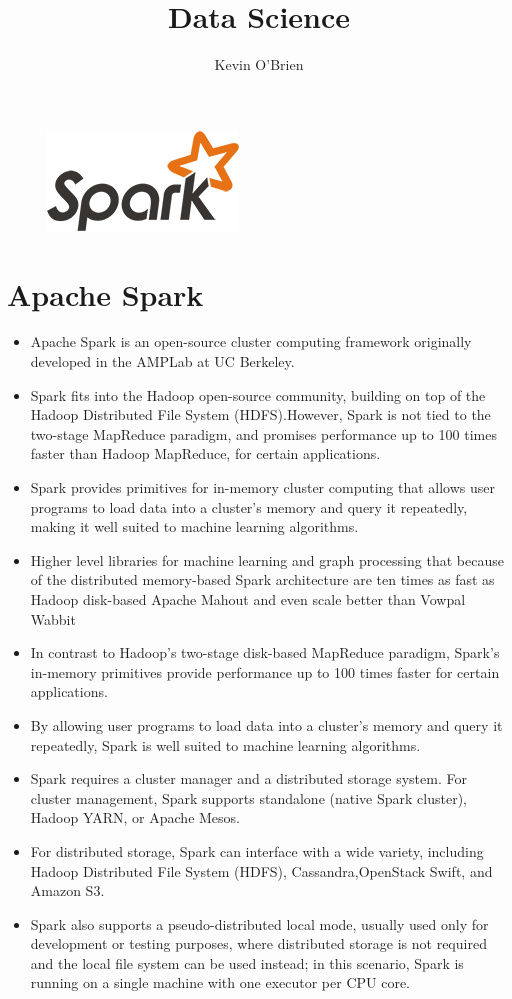 \documentclass[12pt]{article}
\title{Data Science}
\author{Kevin O'Brien}
\begin{document}
	\begin{figure}[h!]
\centering
\includegraphics[width=0.3\linewidth]{ApacheSpark}

\end{figure}
	\section*{Apache Spark}
	\begin{itemize}
		
		\item 
Apache Spark is an open-source cluster computing framework originally developed in the AMPLab at UC Berkeley. 
\item Spark fits into the Hadoop open-source community, building on top of the Hadoop Distributed File System (HDFS).However, Spark is not tied to the two-stage MapReduce paradigm, and promises performance up to 100 times faster than Hadoop MapReduce, for certain applications.

\item Spark provides primitives for in-memory cluster computing that allows user programs to load data into a cluster's memory and query it repeatedly, making it well suited to machine learning algorithms.

\item Higher level libraries for machine learning and graph processing that because of the distributed memory-based Spark architecture are ten times as fast as Hadoop disk-based Apache Mahout and even scale better than Vowpal Wabbit

\item In contrast to Hadoop's two-stage disk-based MapReduce paradigm, Spark's in-memory primitives provide performance up to 100 times faster for certain applications.

\item By allowing user programs to load data into a cluster's memory and query it repeatedly, Spark is well suited to machine learning algorithms.

\item Spark requires a cluster manager and a distributed storage system. For cluster management, Spark supports standalone (native Spark cluster), Hadoop YARN, or Apache Mesos.

\item For distributed storage, Spark can interface with a wide variety, including Hadoop Distributed File System (HDFS), Cassandra,OpenStack Swift, and Amazon S3.

\item Spark also supports a pseudo-distributed local mode, usually used only for development or testing purposes, where distributed storage is not required and the local file system can be used instead; in this scenario, Spark is running on a single machine with one executor per CPU core.
\end{itemize}
\end{document}
